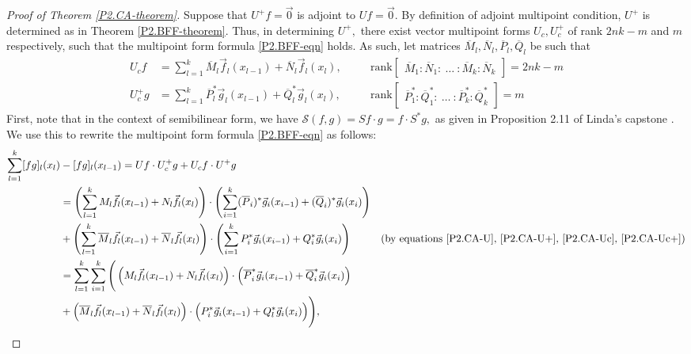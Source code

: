 \documentclass[10pt,reqno,oneside,a4paper]{article}
\begin{document}
\begin{proof}[Proof of Theorem \ref{P2.CA-theorem}]
Suppose that $U^+f = \vec{0}$ is adjoint to $Uf = \vec{0}.$ By definition of adjoint multipoint condition, $U^+$ is determined as in Theorem \ref{P2.BFF-theorem}. Thus, in determining $U^+,$ there exist vector multipoint forms $U_c, U_c^+$ of rank $2nk-m$ and $m$ respectively, such that the multipoint form formula \eqref{P2.BFF-eqn} holds. As such, let matrices $\overline{M}_l, \overline{N}_l, \overline{P}_l,\overline{Q}_l$ be such that
\begin{align}
U_c f &= \sum^k_{l=1} \overline{M}_l \vec{f}_l(x_{l-1}) + \overline{N}_l  \vec{f}_l(x_l), \quad &&\mathrm{rank}\begin{bmatrix} \overline{M}_1 : \overline{N}_1 :~ \ldots ~: \overline{M}_k : \overline{N}_k \end{bmatrix} =  2nk - m \label{P2.CA-Uc}\\
U_c^+ g &= \sum^k_{l=1} \overline{P}_l^* \vec{g}_l(x_{l-1}) + \overline{Q}_l^*  \vec{g}_l(x_l), \quad&& \mathrm{rank}\begin{bmatrix} \overline{P}^*_1 :  \overline{Q}^*_1 :~ \ldots ~: \overline{P}^*_k :  \overline{Q}^*_k \end{bmatrix} = m \label{P2.CA-Uc+}
\end{align}
First, note that in the context of semibilinear form, we have $\mathcal{S}(f,g) = S f \cdot g = f \cdot S^* g,$ as given in Proposition 2.11 of Linda's capstone \cite[p.18]{linfan}. We use this to rewrite the multipoint form formula \eqref{P2.BFF-eqn} as follows:
\begin{align*}
\sum^k_{l=1} [fg]_l(x_l) &- [fg]_l(x_{l-1}) = Uf\cdot U^+_c g + U_c f \cdot U^+ g \\
&= \left(\sum^k_{l=1} M_l \vec{f_l}(x_{l-1}) + N_l \vec{f_l}(x_l)\right)\cdot \left( \sum^k_{i=1} (\overline{P}_i)^* \vec{g}_i(x_{i-1}) + (\overline{Q}_i)^*  \vec{g}_i(x_i)  \right) \\
&+ \left(  \sum^k_{l=1} \overline{M}_l \vec{f}_l(x_{l-1}) + \overline{N}_l  \vec{f}_l(x_l) \right) \cdot \left( \sum^k_{i=1} P^*_i \vec{g}_i(x_{i-1}) + Q^*_i \vec{g}_i(x_i) \right) &\text{(by equations \eqref{P2.CA-U}, \eqref{P2.CA-U+}, \eqref{P2.CA-Uc}, \eqref{P2.CA-Uc+})} \\
&= \sum^k_{l=1}  \sum^k_{i=1} \Bigg(\left( M_l \vec{f_l}(x_{l-1}) + N_l \vec{f_l}(x_l)\right) \cdot \left( \overline{P}_i^* \vec{g}_i(x_{i-1}) + \overline{Q}_i^*  \vec{g}_i(x_i)  \right) \\
&+ \left( \overline{M}_l \vec{f}_l(x_{l-1}) + \overline{N}_l  \vec{f}_l(x_l) \right) \cdot \Big( P^*_i \vec{g}_i(x_{i-1}) + Q^*_l \vec{g}_i(x_i) \Big) \Bigg),

\end{align*}
\end{proof}
\end{document}
